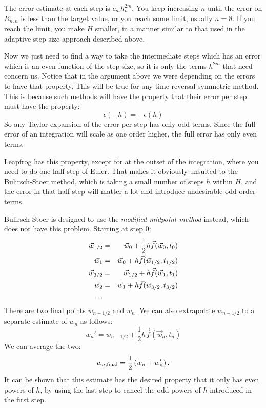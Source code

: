 The error estimate at each step is $c_mh_n^{2m}$. You keep increasing
$n$ until the error on $R_{n,n}$ is less than the target value, or you
reach some limit, usually $n=8$. If you reach the limit, you make $H$
smaller, in a manner similar to that used in the adaptive step size
approach described above. 

Now we just need to find a way to take the intermediate steps which
has an error which is an even function of the step size, so it is only
the terms $h^{2m}$ that need concern us. Notice that in the argument
above we were depending on the errors to have that property. This will
be true for any time-reversal-symmetric method. This is because such
methods will have the property that their error per step must have the
property:
\begin{equation}
\epsilon(-h) = - \epsilon(h)
\end{equation}
So any Taylor expansion of the error per step has only odd
terms. Since the full error of an integration will scale as one order
higher, the full error has only even terms.

Leapfrog has this property, except for at the outset of the
integration, where you need to do one half-step of Euler. That makes
it obviously unsuited to the Bulirsch-Stoer method, which is taking a
small number of steps $h$ within $H$, and the error in that half-step
will matter a lot and introduce undesirable odd-order terms.

Bulirsch-Stoer is designed to use the {\it modified midpoint method}
instead, which does not have this problem. Starting at step $0$:
\begin{eqnarray}
\vec{w}_{1/2} &=& \vec{w}_{0} + \frac{1}{2} h \vec{f}(\vec{w}_0, t_0) \cr
\vec{w}_{1} &=& \vec{w}_{0} + h \vec{f}(\vec{w}_{1/2}, t_{1/2}) \cr
\vec{w}_{3/2} &=& \vec{w}_{1/2} + h \vec{f}(\vec{w}_{1}, t_{1}) \cr
\vec{w}_{2} &=& \vec{w}_{1} + h \vec{f}(\vec{w}_{3/2}, t_{3/2}) \cr
\ldots
\end{eqnarray}
There are two final points $w_{n-1/2}$ and $w_{n}$. We can also extrapolate
$w_{n-1/2}$ to a separate estimate of $w_n$ as follows:
\begin{equation}
w_n' = w_{n-1/2} + \frac{1}{2} h \vec{f}(\vec{w}_{n}, t_{n})
\end{equation}
We can average the two:
\begin{equation}
w_{n, {\rm final}} = \frac{1}{2}\left(w_n + w_n'\right).
\end{equation}
It can be shown that this estimate has the desired property that it
only has even powers of $h$, by using the last step to cancel the odd
powers of $h$ introduced in the first step.

